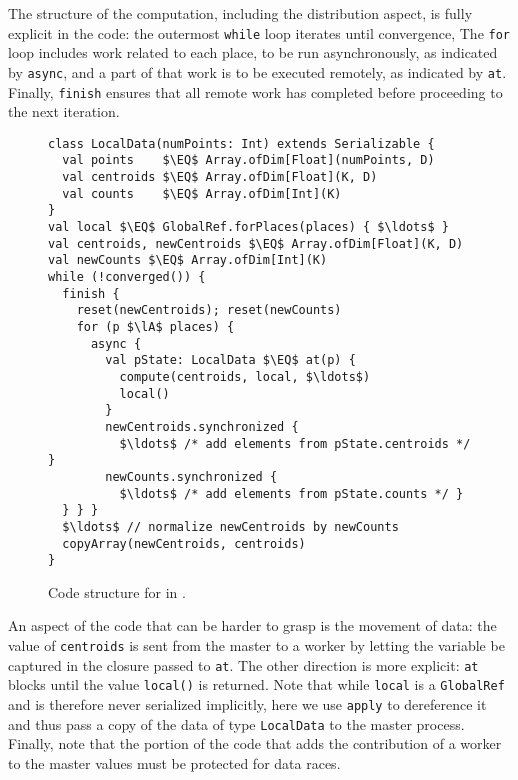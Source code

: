 The structure of the computation, including the distribution
aspect, is fully explicit in the code: the outermost \lstinline{while} loop
iterates until convergence, The \lstinline{for} loop includes work related to
each place, to be run asynchronously, as indicated by \lstinline{async}, and 
a part of that work is to be executed remotely, as indicated by \lstinline{at}.
Finally, \lstinline{finish} ensures that all remote work has completed before
proceeding to the next iteration.
\begin{figure}
\begin{lstlisting}
class LocalData(numPoints: Int) extends Serializable {
  val points    $\EQ$ Array.ofDim[Float](numPoints, D)
  val centroids $\EQ$ Array.ofDim[Float](K, D)
  val counts    $\EQ$ Array.ofDim[Int](K)
}
val local $\EQ$ GlobalRef.forPlaces(places) { $\ldots$ }
val centroids, newCentroids $\EQ$ Array.ofDim[Float](K, D)
val newCounts $\EQ$ Array.ofDim[Int](K)
while (!converged()) {
  finish {
    reset(newCentroids); reset(newCounts)
    for (p $\lA$ places) {
      async {
        val pState: LocalData $\EQ$ at(p) {
          compute(centroids, local, $\ldots$)
          local()
        }
        newCentroids.synchronized {
          $\ldots$ /* add elements from pState.centroids */ }
        newCounts.synchronized {
          $\ldots$ /* add elements from pState.counts */ }
  } } }
  $\ldots$ // normalize newCentroids by newCounts
  copyArray(newCentroids, centroids)
}
\end{lstlisting}
\caption{Code structure for \kmeans in \apgas.\label{fig:kmeansapgas}}
\end{figure}
An aspect of the code that can be harder to grasp is the movement of data: the
value of \lstinline{centroids} is sent from the master to a worker by letting
the variable be captured in the closure passed to \lstinline{at}. The other
direction is more explicit: \lstinline{at} blocks until the value
\lstinline{local()} is returned. Note that while \lstinline{local} is a
\lstinline{GlobalRef} and is therefore never serialized implicitly, here we use
\lstinline{apply} to dereference it and thus pass a copy of the data of type
\lstinline{LocalData} to the master process. Finally, note that the portion of
the code that adds the contribution of a worker to the master values must be
protected for data races.

